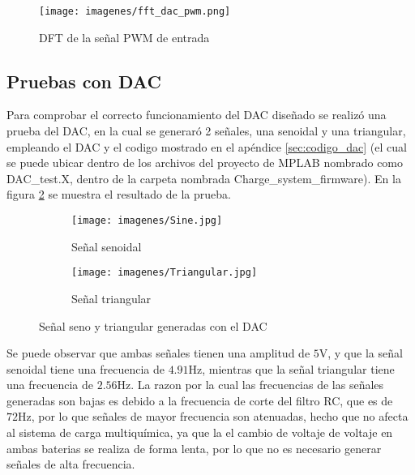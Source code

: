     \begin{figure}[H]
        \centering
        \texttt{[image: imagenes/fft\_dac\_pwm.png]}
        \caption{DFT de la señal PWM de entrada}
        \label{fig:sim_dac_fft_in}
    \end{figure}

    \subsection{Pruebas con DAC}

    Para comprobar el correcto funcionamiento del DAC diseñado se realizó una
    prueba del DAC, en la cual se generaró 2 señales, una senoidal y una triangular,
    empleando el DAC y el codigo mostrado en el apéndice \ref{sec:codigo_dac} (el cual 
    se puede ubicar dentro de los archivos del proyecto de MPLAB nombrado como
    DAC\_test.X, dentro de la carpeta nombrada Charge\_system\_firmware).
     En la figura \ref{fig:dac_test_sine}
    se muestra el resultado de la prueba.
    
     \begin{figure}[H]
        \centering

        \begin{subfigure}{0.45\textwidth}
            \centering
            \texttt{[image: imagenes/Sine.jpg]}
            \caption{Señal senoidal}
        \end{subfigure}
        \begin{subfigure}{0.45\textwidth}
            \centering
            \texttt{[image: imagenes/Triangular.jpg]}
            \caption{Señal triangular}
        \end{subfigure}

        \caption{Señal seno y triangular generadas con el DAC}
        \label{fig:dac_test_sine}
     \end{figure}

     Se puede observar que ambas señales
     tienen una amplitud de $5\text{V}$, y que la señal senoidal tiene una frecuencia
     de $4.91\text{Hz}$, mientras que la señal triangular tiene una frecuencia de
     $2.56\text{Hz}$. La razon por la cual las frecuencias de las señales generadas
     son bajas es debido a la frecuencia de corte del filtro RC, que es de $72\text{Hz}$,
     por lo que señales de mayor frecuencia son atenuadas, hecho que no afecta 
     al sistema de carga multiquímica, ya que la el cambio de voltaje de voltaje 
     en ambas baterias se realiza de forma lenta, por lo que no es necesario
     generar señales de alta frecuencia.
 
